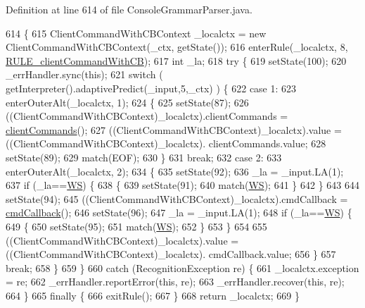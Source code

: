 Definition at line 614 of file Console\+Grammar\+Parser.\+java.


\begin{DoxyCode}
614                                                                                             \{
615     ClientCommandWithCBContext \_localctx = \textcolor{keyword}{new} ClientCommandWithCBContext(\_ctx, getState());
616     enterRule(\_localctx, 8, \hyperlink{classgov_1_1nasa_1_1jpf_1_1inspector_1_1client_1_1parser_1_1_console_grammar_parser_aed1ac3912f490b8fe2045683854f5d7a}{RULE\_clientCommandWithCB});
617     \textcolor{keywordtype}{int} \_la;
618     \textcolor{keywordflow}{try} \{
619       setState(100);
620       \_errHandler.sync(\textcolor{keyword}{this});
621       \textcolor{keywordflow}{switch} ( getInterpreter().adaptivePredict(\_input,5,\_ctx) ) \{
622       \textcolor{keywordflow}{case} 1:
623         enterOuterAlt(\_localctx, 1);
624         \{
625         setState(87);
626         ((ClientCommandWithCBContext)\_localctx).clientCommands = \hyperlink{classgov_1_1nasa_1_1jpf_1_1inspector_1_1client_1_1parser_1_1_console_grammar_parser_a72762b83792e740b30d2732282143634}{clientCommands}();
627          ((ClientCommandWithCBContext)\_localctx).value =  ((ClientCommandWithCBContext)\_localctx).
      clientCommands.value; 
628         setState(89);
629         match(EOF);
630         \}
631         \textcolor{keywordflow}{break};
632       \textcolor{keywordflow}{case} 2:
633         enterOuterAlt(\_localctx, 2);
634         \{
635         setState(92);
636         \_la = \_input.LA(1);
637         \textcolor{keywordflow}{if} (\_la==\hyperlink{classgov_1_1nasa_1_1jpf_1_1inspector_1_1client_1_1parser_1_1_console_grammar_parser_a6914a3a3adbc350b12a7df9d1b24abf1}{WS}) \{
638           \{
639           setState(91);
640           match(\hyperlink{classgov_1_1nasa_1_1jpf_1_1inspector_1_1client_1_1parser_1_1_console_grammar_parser_a6914a3a3adbc350b12a7df9d1b24abf1}{WS});
641           \}
642         \}
643 
644         setState(94);
645         ((ClientCommandWithCBContext)\_localctx).cmdCallback = \hyperlink{classgov_1_1nasa_1_1jpf_1_1inspector_1_1client_1_1parser_1_1_console_grammar_parser_af893e7316098e4d23ed6419676687461}{cmdCallback}();
646         setState(96);
647         \_la = \_input.LA(1);
648         \textcolor{keywordflow}{if} (\_la==\hyperlink{classgov_1_1nasa_1_1jpf_1_1inspector_1_1client_1_1parser_1_1_console_grammar_parser_a6914a3a3adbc350b12a7df9d1b24abf1}{WS}) \{
649           \{
650           setState(95);
651           match(\hyperlink{classgov_1_1nasa_1_1jpf_1_1inspector_1_1client_1_1parser_1_1_console_grammar_parser_a6914a3a3adbc350b12a7df9d1b24abf1}{WS});
652           \}
653         \}
654 
655          ((ClientCommandWithCBContext)\_localctx).value =  ((ClientCommandWithCBContext)\_localctx).
      cmdCallback.value; 
656         \}
657         \textcolor{keywordflow}{break};
658       \}
659     \}
660     \textcolor{keywordflow}{catch} (RecognitionException re) \{
661       \_localctx.exception = re;
662       \_errHandler.reportError(\textcolor{keyword}{this}, re);
663       \_errHandler.recover(\textcolor{keyword}{this}, re);
664     \}
665     \textcolor{keywordflow}{finally} \{
666       exitRule();
667     \}
668     \textcolor{keywordflow}{return} \_localctx;
669   \}
\end{DoxyCode}
